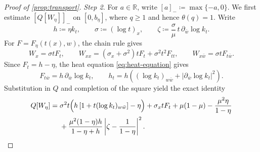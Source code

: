 \documentclass[11pt,a4paper]{article}
\begin{document}
\begin{proof}[Proof of \cref{prop:transport}]
		\emph{Step 2.}
		For $a\in\mathbb R$, write $[a]_-\coloneqq\max\{-a,0\}$.
		We first estimate $[Q[W_\eta]]_-$ on $[0,b_\eta]$, where
		$q\ge1$ and hence $\theta(q)=1$.  Write
		\[
			h\coloneqq\eta k_t,\qquad
			\sigma\coloneqq(\log t)_x,\qquad
			\zeta\coloneqq\frac{\sigma}{\mu}\,
			t\,\partial_{\bar w}\log k_t .
		\]
		For $F=F_\eta(t(x),w)$, the chain rule gives
		\[
			W_x=\sigma tF_t,\qquad
			W_{xx}=(\sigma_x+\sigma^2)tF_t+\sigma^2t^2F_{tt},
			\qquad
			W_{x\bar w}=\sigma tF_{t\bar w}.
		\]
		Since $F_t=h-\eta$, the heat equation
		\eqref{eq:heat-equation} gives
		\[
			F_{t\bar w}=h\,\partial_{\bar w}\log k_t,\qquad
			h_t=h\left((\log k_t)_{w\bar w}
			+|\partial_{\bar w}\log k_t|^2\right).
		\]
		Substitution in $Q$ and completion of the square yield the exact
		identity
		\begin{align}
			Q[W_\eta]={}&
			\sigma^2t\Bigl(
			h\left[1+t(\log k_t)_{w\bar w}\right]-\eta
			\Bigr)
			+\sigma_x tF_t+\mu(1-\mu)-\frac{\mu^2\eta}{1-\eta}
			\nonumber\\
			&+
			\frac{\mu^2(1-\eta)h}{1-\eta+h}
			\left|\zeta-\frac1{1-\eta}\right|^2 .
			\label{eq:direct-Q-identity}
		\end{align}


\end{proof}
\end{document}
